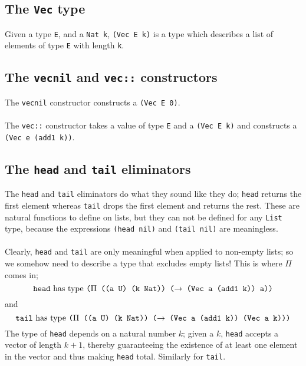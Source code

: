 \documentclass{article}
\newcommand{\ttt}[1]{\texttt{#1}}
\begin{document}
\subsection{The \ttt{Vec} type}
Given a type \ttt{E}, and a \ttt{Nat k}, \ttt{(Vec E k)} is a type which describes a list of elements of type \ttt{E} with length \ttt{k}.
\subsection{The \ttt{vecnil} and \ttt{vec::} constructors}
The \ttt{vecnil} constructor constructs a \ttt{(Vec E 0)}.
\\ \\
The \ttt{vec::} constructor takes a value of type \ttt{E} and a \ttt{(Vec E k)} and constructs a \ttt{(Vec e (add1 k))}.
\subsection{The \ttt{head} and \ttt{tail} eliminators}
The \ttt{head} and \ttt{tail} eliminators do what they sound like they do; \ttt{head} returns the first element whereas \ttt{tail} drops the first element and returns the rest. These are natural functions to define on lists, but they can not be defined for any \ttt{List} type, because the expressions \ttt{(head nil)} and \ttt{(tail nil)} are meaningless. 
\\ \\
Clearly, \ttt{head} and \ttt{tail} are only meaningful when applied to non-empty lists; so we somehow need to describe a type that excludes empty lists! This is where \(\Pi\) comes in; \[
    \text{\ttt{head} has type \ttt{(\(\Pi\) ((a U) (k Nat)) (\(\to\) (Vec a (add1 k)) a))}}
\] and \[
    \text{\ttt{tail} has type \ttt{(\(\Pi\) ((a U) (k Nat)) (\(\to\) (Vec a (add1 k)) (Vec a k)))}}
\]
The type of \ttt{head} depends on a natural number \(k\); given a \(k\), \ttt{head} accepts a vector of length \(k + 1\), thereby guaranteeing the existence of at least one element in the vector and thus making \ttt{head} total. Similarly for \ttt{tail}.
\end{document}
